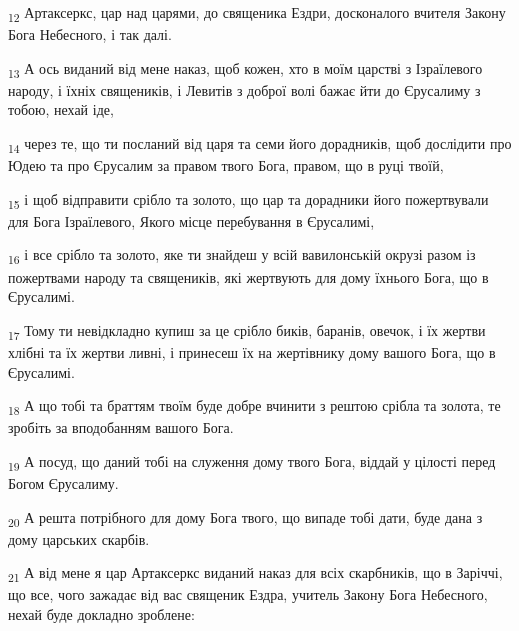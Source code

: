 \begin{tcolorbox}
\textsubscript{12} Артаксеркс, цар над царями, до священика Ездри, досконалого вчителя Закону Бога Небесного, і так далі.
\end{tcolorbox}
\begin{tcolorbox}
\textsubscript{13} А ось виданий від мене наказ, щоб кожен, хто в моїм царстві з Ізраїлевого народу, і їхніх священиків, і Левитів з доброї волі бажає йти до Єрусалиму з тобою, нехай іде,
\end{tcolorbox}
\begin{tcolorbox}
\textsubscript{14} через те, що ти посланий від царя та семи його дорадників, щоб дослідити про Юдею та про Єрусалим за правом твого Бога, правом, що в руці твоїй,
\end{tcolorbox}
\begin{tcolorbox}
\textsubscript{15} і щоб відправити срібло та золото, що цар та дорадники його пожертвували для Бога Ізраїлевого, Якого місце перебування в Єрусалимі,
\end{tcolorbox}
\begin{tcolorbox}
\textsubscript{16} і все срібло та золото, яке ти знайдеш у всій вавилонській окрузі разом із пожертвами народу та священиків, які жертвують для дому їхнього Бога, що в Єрусалимі.
\end{tcolorbox}
\begin{tcolorbox}
\textsubscript{17} Тому ти невідкладно купиш за це срібло биків, баранів, овечок, і їх жертви хлібні та їх жертви ливні, і принесеш їх на жертівнику дому вашого Бога, що в Єрусалимі.
\end{tcolorbox}
\begin{tcolorbox}
\textsubscript{18} А що тобі та браттям твоїм буде добре вчинити з рештою срібла та золота, те зробіть за вподобанням вашого Бога.
\end{tcolorbox}
\begin{tcolorbox}
\textsubscript{19} А посуд, що даний тобі на служення дому твого Бога, віддай у цілості перед Богом Єрусалиму.
\end{tcolorbox}
\begin{tcolorbox}
\textsubscript{20} А решта потрібного для дому Бога твого, що випаде тобі дати, буде дана з дому царських скарбів.
\end{tcolorbox}
\begin{tcolorbox}
\textsubscript{21} А від мене я цар Артаксеркс виданий наказ для всіх скарбників, що в Заріччі, що все, чого зажадає від вас священик Ездра, учитель Закону Бога Небесного, нехай буде докладно зроблене:
\end{tcolorbox}

